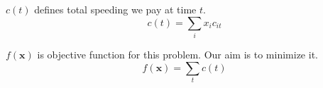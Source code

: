 \begin{definition}{$c(t)$}
defines total speeding we pay at time $t$.
    \begin{equation}
        \label{eq:cost-t}
        c(t) = \sum_i{x_ic_{it}}
    \end{equation}
\end{definition}

\begin{definition}{$f(\mathbf{x})$}
    is objective function for this problem. Our aim is to minimize it.
    \begin{equation}
        f(\mathbf{x}) =  \sum_t{c(t)}
        \label{eq:cost-f}
    \end{equation}
\end{definition}
